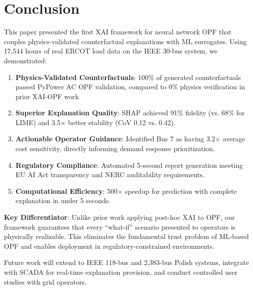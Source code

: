 \documentclass[journal,12pt,onecolumn]{IEEEtran}
\begin{document}
\section{Conclusion}
\label{sec:conclusion}

This paper presented the first XAI framework for neural network OPF that couples physics-validated counterfactual explanations with ML surrogates. Using 17,544 hours of real ERCOT load data on the IEEE 30-bus system, we demonstrated:

\begin{enumerate}
    \item \textbf{Physics-Validated Counterfactuals}: 100\% of generated counterfactuals passed PyPower AC OPF validation, compared to 0\% physics verification in prior XAI-OPF work.
    
    \item \textbf{Superior Explanation Quality}: SHAP achieved 91\% fidelity (vs. 68\% for LIME) and 3.5$\times$ better stability (CoV 0.12 vs. 0.42).
    
    \item \textbf{Actionable Operator Guidance}: Identified Bus 7 as having 3.2$\times$ average cost sensitivity, directly informing demand response prioritization.
    
    \item \textbf{Regulatory Compliance}: Automated 5-second report generation meeting EU AI Act transparency and NERC auditability requirements.
    
    \item \textbf{Computational Efficiency}: 500$\times$ speedup for prediction with complete explanation in under 5 seconds.
\end{enumerate}

\textbf{Key Differentiator}: Unlike prior work applying post-hoc XAI to OPF, our framework guarantees that every ``what-if'' scenario presented to operators is physically realizable. This eliminates the fundamental trust problem of ML-based OPF and enables deployment in regulatory-constrained environments.

Future work will extend to IEEE 118-bus and 2,383-bus Polish systems, integrate with SCADA for real-time explanation provision, and conduct controlled user studies with grid operators.
\end{document}

